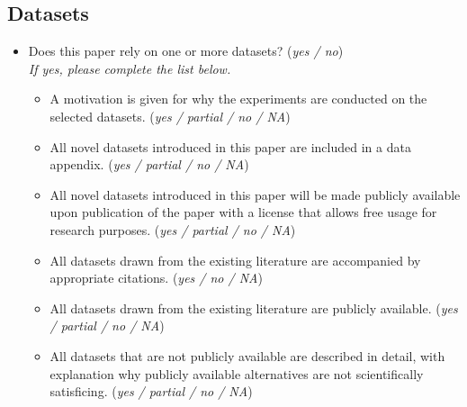 \documentclass[letterpaper]{article} %
\begin{document}
\subsection*{Datasets}
\begin{itemize}
    \item Does this paper rely on one or more datasets? \hfill (\textit{yes / no}) \\
    \textit{If yes, please complete the list below.}
    \begin{itemize}
        \item A motivation is given for why the experiments are conducted on the selected datasets. \hfill (\textit{yes / partial / no / NA})
        \item All novel datasets introduced in this paper are included in a data appendix. \hfill (\textit{yes / partial / no / NA})
        \item All novel datasets introduced in this paper will be made publicly available upon publication of the paper with a license that allows free usage for research purposes. \hfill (\textit{yes / partial / no / NA})
        \item All datasets drawn from the existing literature are accompanied by appropriate citations. \hfill (\textit{yes / no / NA})
        \item All datasets drawn from the existing literature are publicly available. \hfill (\textit{yes / partial / no / NA})
        \item All datasets that are not publicly available are described in detail, with explanation why publicly available alternatives are not scientifically satisficing. \hfill (\textit{yes / partial / no / NA})
    \end{itemize}
\end{itemize}
\end{document}
